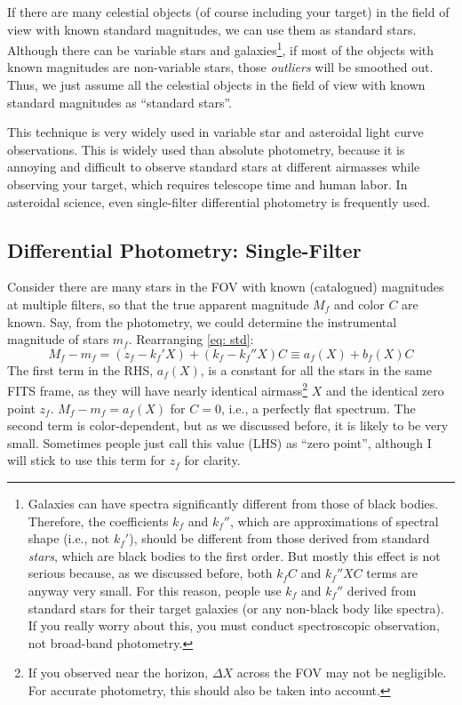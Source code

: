 If there are many celestial objects (of course including your target) in the field of view with known standard magnitudes, we can use them as standard stars. Although there can be variable stars and galaxies\footnote{Galaxies can have spectra significantly different from those of black bodies. Therefore, the coefficients $ k_f $ and $ k_f'' $, which are approximations of spectral shape (i.e., not $ k_f' $), should be different from those derived from standard \textit{stars}, which are black bodies to the first order. But mostly this effect is not serious because, as we discussed before, both $ k_f C $ and $ k_f'' X C $ terms are anyway very small. For this reason, people use $ k_f $ and $ k_f'' $ derived from standard stars for their target galaxies (or any non-black body like spectra). If you really worry about this, you must conduct spectroscopic observation, not broad-band photometry.}, if most of the objects with known magnitudes are non-variable stars, those \textit{outliers} will be smoothed out. Thus, we just assume all the celestial objects in the field of view with known standard magnitudes as ``standard stars''. 

This technique is very widely used in variable star and asteroidal light curve observations. This is widely used than absolute photometry, because it is annoying and difficult to observe standard stars at different airmasses while observing your target, which requires telescope time and human labor. In asteroidal science, even single-filter differential photometry is frequently used. 

\subsection{Differential Photometry: Single-Filter}

Consider there are many stars in the FOV with known (catalogued) magnitudes at multiple filters, so that the true apparent magnitude $ M_f $ and color $ C $ are known. Say, from the photometry, we could determine the instrumental magnitude of stars $ m_f $. Rearranging \cref{eq: std}:
\begin{equation} \label{eq: zeropt}
  M_f - m_f = (z_f - k_f' X) + (k_f - k_f'' X) C \equiv a_f (X) + b_f (X) C
\end{equation}
The first term in the RHS, $ a_f (X) $, is a constant for all the stars in the same FITS frame, as they will have nearly identical airmass\footnote{If you observed near the horizon, $ \Delta X $ across the FOV may not be negligible. For accurate photometry, this should also be taken into account.} $ X $ and the identical zero point $ z_f $. $ M_f - m_f = a_f(X) $ for $ C = 0 $, i.e., a perfectly flat spectrum. The second term is color-dependent, but as we discussed before, it is likely to be very small. Sometimes people just call this value (LHS) as ``zero point'', although I will stick to use this term for $ z_f $ for clarity. 

